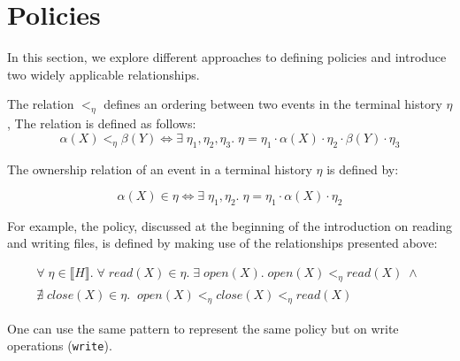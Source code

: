\section{Policies}\label{sec:policies}

In this section, we explore different approaches to defining policies and introduce two widely applicable relationships.

\begin{definition}
    The relation $<_{\eta}$ defines an ordering between two events in the terminal history $\eta$, The relation is defined as follows:
    \begin{equation}
        \alpha(X) <_{\eta} \beta(Y) \Longleftrightarrow \exists \; \eta_1, \eta_2, \eta_3. \; \eta = \eta_1 \cdot \alpha(X) \cdot \eta_2 \cdot \beta(Y) \cdot \eta_3
    \end{equation}
\end{definition}

\begin{definition}
    The ownership relation of an event in a terminal history $\eta$ is defined by:

    \begin{equation}
        \alpha(X) \in \eta \Longleftrightarrow \exists \; \eta_1, \eta_2. \; \eta = \eta_1 \cdot \alpha(X) \cdot \eta_2
    \end{equation}
\end{definition}

\begin{example}
    For example, the policy, discussed at the beginning of the introduction on reading and writing files, is defined by making use of the relationships presented above:
    
    \begin{equation}
        \begin{gathered}
            \forall \; \eta \in \llbracket H \rrbracket .\; \forall \; read(X) \in \eta .\; \exists \; open(X) . \; open(X) <_{\eta} read(X) \;\land\; \\ 
            \nexists \; close(X) \in \eta .\; \; open(X) <_{\eta} close(X) <_{\eta} read(X)
        \end{gathered}
    \end{equation}

  One can use the same pattern to represent the same policy but on write operations (\verb|write|).
\end{example}